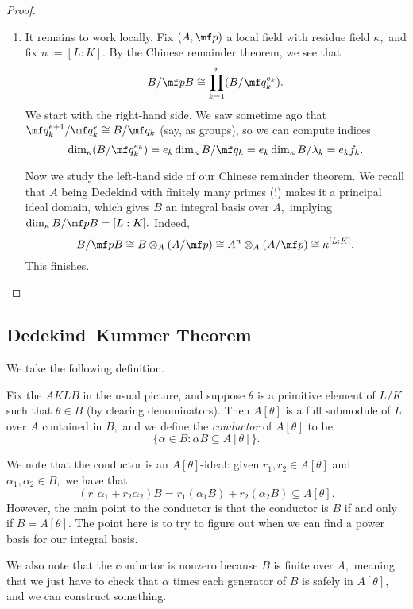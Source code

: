 \begin{proof}
\begin{enumerate}
		\item It remains to work locally. Fix $(A,\mf p)$ a local field with residue field $\kappa,$ and fix $n:=[L:K].$ By the Chinese remainder theorem, we see that
		\[B/\mf pB\cong\prod_{k=1}^r(B/\mf q_k^{e_k}).\]
		We start with the right-hand side. We saw sometime ago that $\mf q_k^{e+1}/\mf q_k^e\cong B/\mf q_k$ (say, as groups), so we can compute indices
		\[\dim_\kappa(B/\mf q_k^{e_k})=e_k\dim_\kappa B/\mf q_k=e_k\dim_\kappa B/\lambda_k=e_kf_k.\]

		Now we study the left-hand side of our Chinese remainder theorem. We recall that $A$ being Dedekind with finitely many primes (!) makes it a principal ideal domain, which gives $B$ an integral basis over $A,$ implying $\dim_\kappa B/\mf pB=[L:K].$ Indeed,
		\[B/\mf pB\cong B\otimes_A(A/\mf p)\cong A^n\otimes_A(A/\mf p)\cong\kappa^{[L:K]}.\]
		This finishes.
		\qedhere
	\end{enumerate}
\end{proof}

\subsection{Dedekind--Kummer Theorem}
We take the following definition.
\begin{defi}[Conductor]
	Fix the $AKLB$ in the usual picture, and suppose $\theta$ is a primitive element of $L/K$ such that $\theta\in B$ (by clearing denominators). Then $A[\theta]$ is a full submodule of $L$ over $A$ contained in $B,$ and we define the \textit{conductor} of $A[\theta]$ to be
	\[\{\alpha\in B:\alpha B\subseteq A[\theta]\}.\]
\end{defi}
We note that the conductor is an $A[\theta]$-ideal: given $r_1,r_2\in A[\theta]$ and $\alpha_1,\alpha_2\in B,$ we have that
\[(r_1\alpha_1+r_2\alpha_2)B=r_1(\alpha_1B)+r_2(\alpha_2B)\subseteq A[\theta].\]
However, the main point to the conductor is that the conductor is $B$ if and only if $B=A[\theta].$ The point here is to try to figure out when we can find a power basis for our integral basis.

We also note that the conductor is nonzero because $B$ is finite over $A,$ meaning that we just have to check that $\alpha$ times each generator of $B$ is safely in $A[\theta],$ and we can construct something.

